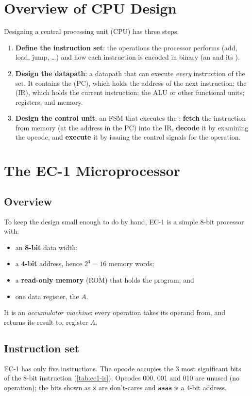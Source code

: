 \section{Overview of CPU Design}\label{sec:cpu-design}
Designing a central processing unit (CPU) has three steps.
\begin{enumerate}
  \item \textbf{Define the instruction set}: the operations the processor performs (add, load, jump, \dots) and how each instruction is encoded in binary (an  and its ).
  \item \textbf{Design the datapath}: a datapath that can execute \emph{every} instruction of the set. It contains the  (PC), which holds the address of the next instruction; the  (IR), which holds the current instruction; the ALU or other functional units; registers; and memory.
  \item \textbf{Design the control unit}: an FSM that executes the : \textbf{fetch} the instruction from memory (at the address in the PC) into the IR, \textbf{decode} it by examining the opcode, and \textbf{execute} it by issuing the control signals for the operation.
\end{enumerate}

\section{The EC-1 Microprocessor}\label{sec:ec1}
\subsection{Overview}
To keep the design small enough to do by hand, EC-1 is a simple 8-bit processor with:
\begin{itemize}
  \item an \textbf{8-bit} data width;
  \item a \textbf{4-bit} address, hence $2^4=16$ memory words;
  \item a \textbf{read-only memory} (ROM) that holds the program; and
  \item one data register, the  $A$.
\end{itemize}
It is an \emph{accumulator machine}: every operation takes its operand from, and returns its result to, register $A$.

\subsection{Instruction set}
EC-1 has only five instructions. The opcode occupies the 3 most significant bits of the 8-bit instruction (\cref{tab:ec1-is}). Opcodes 000, 001 and 010 are unused (no operation); the bits shown as \texttt{x} are don't-cares and \texttt{aaaa} is a 4-bit address.

